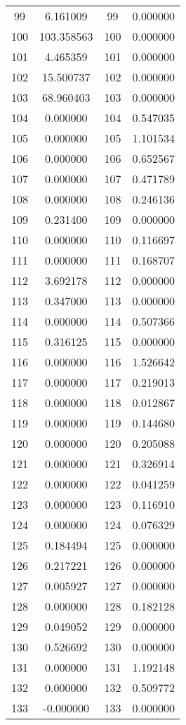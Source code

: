 \documentclass[12pt]{article}
\begin{document}
\begin{longtable}{@{}cccc@{}}
99 & 6.161009 & 99 & 0.000000 \\
100 & 103.358563 & 100 & 0.000000 \\
101 & 4.465359 & 101 & 0.000000 \\
102 & 15.500737 & 102 & 0.000000 \\
103 & 68.960403 & 103 & 0.000000 \\
104 & 0.000000 & 104 & 0.547035 \\
105 & 0.000000 & 105 & 1.101534 \\
106 & 0.000000 & 106 & 0.652567 \\
107 & 0.000000 & 107 & 0.471789 \\
108 & 0.000000 & 108 & 0.246136 \\
109 & 0.231400 & 109 & 0.000000 \\
110 & 0.000000 & 110 & 0.116697 \\
111 & 0.000000 & 111 & 0.168707 \\
112 & 3.692178 & 112 & 0.000000 \\
113 & 0.347000 & 113 & 0.000000 \\
114 & 0.000000 & 114 & 0.507366 \\
115 & 0.316125 & 115 & 0.000000 \\
116 & 0.000000 & 116 & 1.526642 \\
117 & 0.000000 & 117 & 0.219013 \\
118 & 0.000000 & 118 & 0.012867 \\
119 & 0.000000 & 119 & 0.144680 \\
120 & 0.000000 & 120 & 0.205088 \\
121 & 0.000000 & 121 & 0.326914 \\
122 & 0.000000 & 122 & 0.041259 \\
123 & 0.000000 & 123 & 0.116910 \\
124 & 0.000000 & 124 & 0.076329 \\
125 & 0.184494 & 125 & 0.000000 \\
126 & 0.217221 & 126 & 0.000000 \\
127 & 0.005927 & 127 & 0.000000 \\
128 & 0.000000 & 128 & 0.182128 \\
129 & 0.049052 & 129 & 0.000000 \\
130 & 0.526692 & 130 & 0.000000 \\
131 & 0.000000 & 131 & 1.192148 \\
132 & 0.000000 & 132 & 0.509772 \\
133 & -0.000000 & 133 & 0.000000 \\

\end{longtable}
\end{document}
